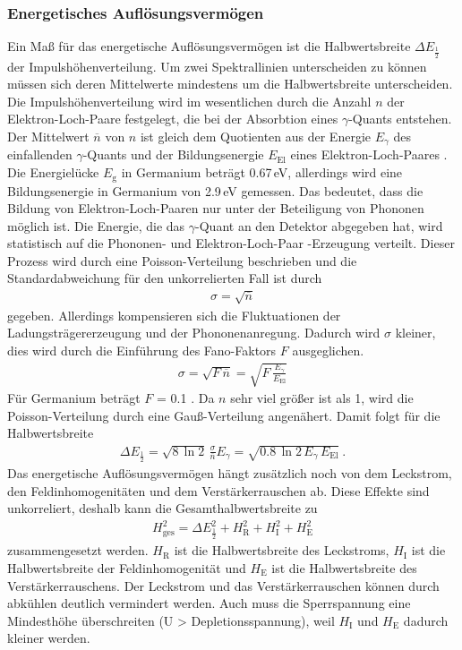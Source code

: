 \subsubsection{Energetisches Auflösungsvermögen}
\label{sec:EAuflösung}
Ein Maß für das energetische Auflösungsvermögen ist die Halbwertsbreite $\Delta E_\frac{1}{2}$ der Impulshöhenverteilung. Um zwei Spektrallinien unterscheiden zu können müssen sich deren Mittelwerte mindestens um die Halbwertsbreite unterscheiden. \\
Die Impulshöhenverteilung wird im wesentlichen durch die Anzahl $n$ der Elektron-Loch-Paare festgelegt, die bei der Absorbtion eines $\gamma$-Quants entstehen. Der Mittelwert $\overline{n}$ von $n$ ist gleich dem Quotienten aus der Energie $E_\gamma$ des einfallenden $\gamma$-Quants und der Bildungsenergie $E_\text{El}$ eines Elektron-Loch-Paares \cite[14]{V18}. Die Energielücke $E_\text{g}$ in Germanium beträgt 0.67\,eV, allerdings wird eine Bildungsenergie in Germanium von 2.9\,eV gemessen. Das bedeutet, dass die Bildung von Elektron-Loch-Paaren nur unter der Beteiligung von Phononen möglich ist. Die Energie, die das $\gamma$-Quant an den Detektor abgegeben hat, wird statistisch auf die Phononen- und Elektron-Loch-Paar -Erzeugung verteilt. Dieser Prozess wird durch eine Poisson-Verteilung beschrieben und die Standardabweichung für den unkorrelierten Fall ist durch
\begin{align}
	\sigma = \sqrt{\overline{n}}
\end{align}
gegeben. Allerdings kompensieren sich die Fluktuationen der Ladungsträgererzeugung und der Phononenanregung. Dadurch wird $\sigma$ kleiner, dies wird durch die Einführung des Fano-Faktors $F$ ausgeglichen.
\begin{align}
	\sigma = \sqrt{F\,\overline{n}} = \sqrt{F\,\frac{E_\gamma}{E_\text{El}}}
\end{align}
Für Germanium beträgt $F$ = 0.1 \cite[15]{V18}. Da $n$ sehr viel größer ist als 1, wird die Poisson-Verteilung durch eine Gauß-Verteilung angenähert. Damit folgt für die Halbwertsbreite
\begin{align}
	\Delta E_\frac{1}{2} = \sqrt{8\,\ln2} \, \frac{\sigma} {\overline{n}} E_\gamma = \sqrt{0.8\,\ln2\,E_\gamma \, E_\text{El}} \ .
\end{align}
Das energetische Auflösungsvermögen hängt zusätzlich noch von dem Leckstrom, den Feldinhomogenitäten und dem Verstärkerrauschen ab. Diese Effekte sind unkorreliert, deshalb kann die Gesamthalbwertsbreite zu
\begin{align}
	H_\text{ges}^2 = \Delta E_\frac{1}{2}^2 + H_\text{R}^2 + H_\text{I}^2 + H_\text{E}^2
\end{align}
zusammengesetzt werden. $H_\text{R}$ ist die Halbwertsbreite des Leckstroms, $H_\text{I}$ ist die Halbwertsbreite der Feldinhomogenität und $H_\text{E}$ ist die Halbwertsbreite des Verstärkerrauschens. Der Leckstrom und das Verstärkerrauschen können durch abkühlen deutlich vermindert werden. Auch muss die Sperrspannung eine Mindesthöhe überschreiten (U > Depletionsspannung), weil $H_\text{I}$ und $H_\text{E}$ dadurch kleiner werden.



